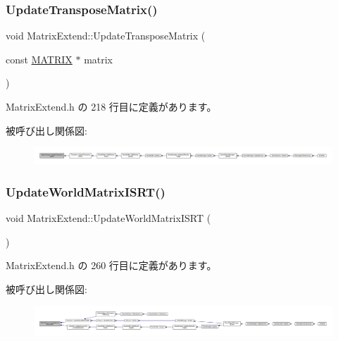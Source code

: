 \subsubsection{\texorpdfstring{Update\+Transpose\+Matrix()}{UpdateTransposeMatrix()}}
{\footnotesize\ttfamily void Matrix\+Extend\+::\+Update\+Transpose\+Matrix (\begin{DoxyParamCaption}\item[{const \mbox{\hyperlink{_vector3_d_8h_a032295cd9fb1b711757c90667278e744}{M\+A\+T\+R\+IX}} $\ast$}]{matrix }\end{DoxyParamCaption})\hspace{0.3cm}{\ttfamily [inline]}}



 Matrix\+Extend.\+h の 218 行目に定義があります。

被呼び出し関係図\+:
\nopagebreak
\begin{figure}[H]
\begin{center}
\leavevmode
\includegraphics[width=350pt]{class_matrix_extend_a81e92fe4305ff9569809b61e2e92df31_icgraph}
\end{center}
\end{figure}
\mbox{\label{class_matrix_extend_ab0aaf14f8621fde91f9db5537a4187e6}} 
\subsubsection{\texorpdfstring{Update\+World\+Matrix\+I\+S\+R\+T()}{UpdateWorldMatrixISRT()}}
{\footnotesize\ttfamily void Matrix\+Extend\+::\+Update\+World\+Matrix\+I\+S\+RT (\begin{DoxyParamCaption}{ }\end{DoxyParamCaption})\hspace{0.3cm}{\ttfamily [inline]}}



 Matrix\+Extend.\+h の 260 行目に定義があります。

被呼び出し関係図\+:
\nopagebreak
\begin{figure}[H]
\begin{center}
\leavevmode
\includegraphics[width=350pt]{class_matrix_extend_ab0aaf14f8621fde91f9db5537a4187e6_icgraph}
\end{center}
\end{figure}
\mbox{\label{class_matrix_extend_a4c92a6d037b00bc2514064e00323c5dd}} 

